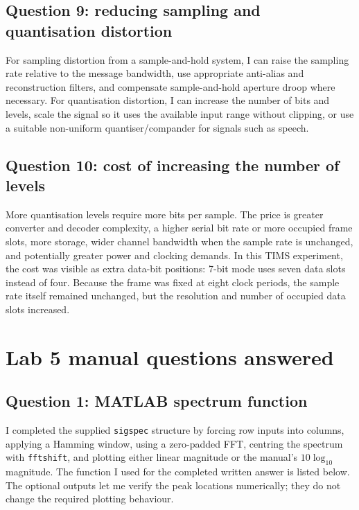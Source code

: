 \documentclass[11pt,a4paper]{article}
\begin{document}
\subsection{Question 9: reducing sampling and quantisation distortion}
\begin{answerbox}
For sampling distortion from a sample-and-hold system, I can raise the sampling rate relative to the message bandwidth, use appropriate anti-alias and reconstruction filters, and compensate sample-and-hold aperture droop where necessary. For quantisation distortion, I can increase the number of bits and levels, scale the signal so it uses the available input range without clipping, or use a suitable non-uniform quantiser/compander for signals such as speech.
\end{answerbox}

\subsection{Question 10: cost of increasing the number of levels}
\begin{answerbox}
More quantisation levels require more bits per sample. The price is greater converter and decoder complexity, a higher serial bit rate or more occupied frame slots, more storage, wider channel bandwidth when the sample rate is unchanged, and potentially greater power and clocking demands. In this TIMS experiment, the cost was visible as extra data-bit positions: 7-bit mode uses seven data slots instead of four. Because the frame was fixed at eight clock periods, the sample rate itself remained unchanged, but the resolution and number of occupied data slots increased.
\end{answerbox}

\section{Lab 5 manual questions answered}

\subsection{Question 1: MATLAB spectrum function}
\begin{answerbox}
I completed the supplied \texttt{sigspec} structure by forcing row inputs into columns, applying a Hamming window, using a zero-padded FFT, centring the spectrum with \texttt{fftshift}, and plotting either linear magnitude or the manual's $10\log_{10}$ magnitude. The function I used for the completed written answer is listed below. The optional outputs let me verify the peak locations numerically; they do not change the required plotting behaviour.
\end{answerbox}
\end{document}
